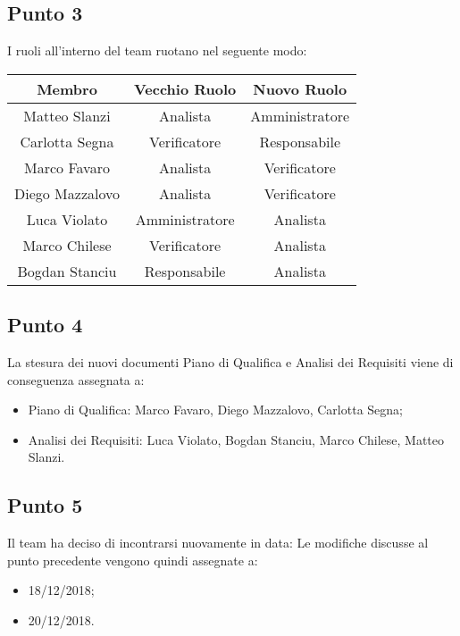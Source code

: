 \subsection{Punto 3}
I ruoli all'interno del team ruotano nel seguente modo:\\
\begin{center}
\begin{tabular}{|c|c|c|}
\hline
Membro & Vecchio Ruolo & Nuovo Ruolo\\
\hline
Matteo Slanzi & Analista & Amministratore\\
\hline
Carlotta Segna & Verificatore & Responsabile\\
\hline
Marco Favaro & Analista & Verificatore\\
\hline
Diego Mazzalovo & Analista & Verificatore\\
\hline
Luca Violato & Amministratore & Analista\\
\hline
Marco Chilese & Verificatore & Analista\\
\hline
Bogdan Stanciu & Responsabile & Analista\\
\hline
\end{tabular}
\end{center}

\subsection{Punto 4}
La stesura dei nuovi documenti Piano di Qualifica e Analisi dei Requisiti viene di conseguenza assegnata a:
\begin{itemize}
	\item Piano di Qualifica: Marco Favaro, Diego Mazzalovo, Carlotta Segna;
	\item Analisi dei Requisiti: Luca Violato, Bogdan Stanciu, Marco Chilese, Matteo Slanzi.
\end{itemize}

\subsection{Punto 5}
Il team ha deciso di incontrarsi nuovamente in data:
Le modifiche discusse al punto precedente vengono quindi assegnate a:
\begin{itemize}
	\item 18/12/2018;
	\item 20/12/2018.
\end{itemize}